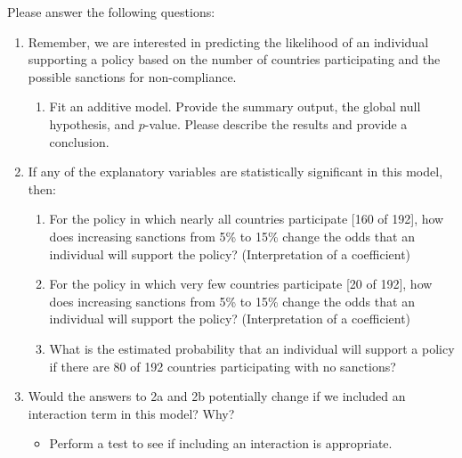\documentclass[12pt,letterpaper]{article}
\begin{document}
\newpage
\noindent Please answer the following questions:

\begin{enumerate}
	\item
	Remember, we are interested in predicting the likelihood of an individual supporting a policy based on the number of countries participating and the possible sanctions for non-compliance.
	\begin{enumerate}
		\item [] Fit an additive model. Provide the summary output, the global null hypothesis, and $p$-value. Please describe the results and provide a conclusion.

	\end{enumerate}
	
	\item
	If any of the explanatory variables are statistically significant in this model, then:
	\begin{enumerate}
		\item
		For the policy in which nearly all countries participate [160 of 192], how does increasing sanctions from 5\% to 15\% change the odds that an individual will support the policy? (Interpretation of a coefficient)
		\item
		For the policy in which very few countries participate [20 of 192], how does increasing sanctions from 5\% to 15\% change the odds that an individual will support the policy? (Interpretation of a coefficient)
		\item
		What is the estimated probability that an individual will support a policy if there are 80 of 192 countries participating with no sanctions? 
	
	\end{enumerate}
	\item
	Would the answers to 2a and 2b potentially change if we included an interaction term in this model? Why? 
	\begin{itemize}
		\item Perform a test to see if including an interaction is appropriate.
	\end{itemize}
	\end{enumerate}
	\newpage
\end{document}
